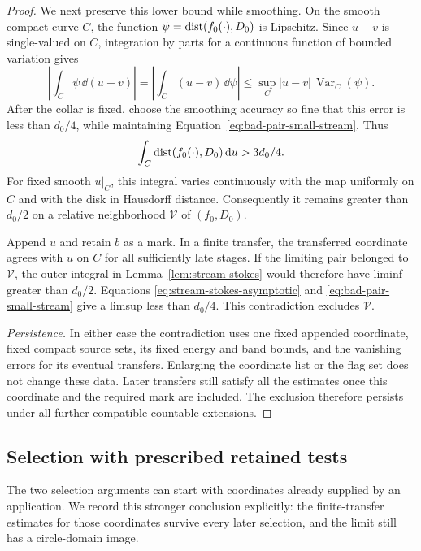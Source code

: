 \begin{proof}
We next preserve this lower bound while smoothing.  On the smooth
compact curve $C$, the function $\psi=\operatorname{dist}(f_0(\cdot),D_0)$ is Lipschitz.  Since
$u-v$ is single-valued on $C$, integration by parts for a continuous
function of bounded variation gives
\[
 \left|\int_C\psi\,\dd(u-v)\right|
   =\left|\int_C(u-v)\,\dd\psi\right|
   \le \sup_C|u-v|\,\operatorname{Var}_C(\psi).
\]
After the collar is fixed, choose the smoothing accuracy so fine that
this error is less than $d_0/4$, while maintaining
Equation~\eqref{eq:bad-pair-small-stream}.  Thus
\[
 \int_C\operatorname{dist}(f_0(\cdot),D_0)\,\mathrm d u>3d_0/4.
\]
For fixed smooth $u|_C$, this integral varies continuously with the
map uniformly on $C$ and with the disk in Hausdorff distance.
Consequently it remains greater than $d_0/2$ on a relative neighborhood
$\mathcal V$ of $(f_0,D_0)$.

Append $u$ and retain $b$ as a mark.  In a finite transfer, the
transferred coordinate agrees with $u$ on $C$ for all sufficiently
late stages.  If the limiting pair belonged to $\mathcal V$, the
outer integral in Lemma~\ref{lem:stream-stokes} would therefore have
liminf greater than $d_0/2$.  Equations
\eqref{eq:stream-stokes-asymptotic} and
\eqref{eq:bad-pair-small-stream} give a limsup less than $d_0/4$.
This contradiction excludes $\mathcal V$.

\smallskip\noindent\emph{Persistence.}
In either case the contradiction uses one fixed appended coordinate,
fixed compact source sets, its fixed energy and band bounds, and the
vanishing errors for its eventual transfers.  Enlarging the coordinate
list or the flag set does not change these data.  Later transfers
still satisfy all the estimates once this coordinate and the required
mark are included.  The exclusion therefore persists under all
further compatible countable extensions.
\end{proof}

\subsection{Selection with prescribed retained tests}

The two selection arguments can start with coordinates already supplied
by an application.  We record this stronger conclusion explicitly: the
finite-transfer estimates for those coordinates survive every later
selection, and the limit still has a circle-domain image.


